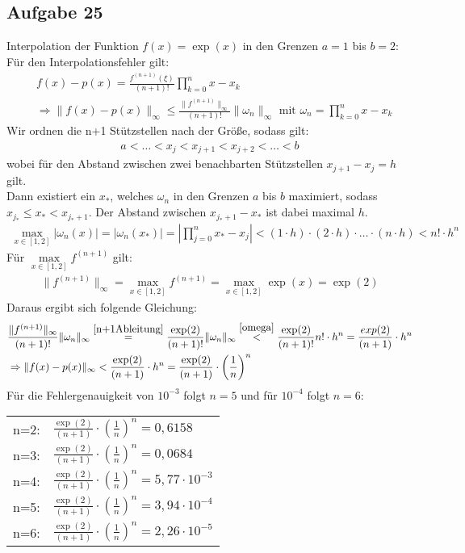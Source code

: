 \subsection*{Aufgabe 25}

Interpolation der Funktion $f(x)=\exp(x)$  in den Grenzen $a=1$ bis $b=2$:\\
\newline
Für den Interpolationsfehler gilt:
\begin{align*}
&f(x)-p(x)=\frac{f^{(n+1)}(\xi)}{(n+1)!}\prod_{k=0}^{n}x-x_k\\
&\Rightarrow \|f(x)-p(x)\|_\infty \le \frac{\|f^{(n+1)}\|_\infty}{(n+1)!} \|\omega_n\|_\infty \text{ mit } \omega_n=\prod_{k=0}^{n}x-x_k
\end{align*}
Wir ordnen die n+1 Stützstellen nach der Größe, sodass gilt:
\begin{align*}
a<\ldots<x_j<x_{j+1}<x_{j+2}<\ldots<b
\end{align*}
wobei für den Abstand zwischen zwei benachbarten Stützstellen $x_{j+1}-x_j=h$ gilt.\\
Dann existiert ein $x_*$, welches $\omega_n$ in den Grenzen $a$ bis $b$ maximiert,  sodass $x_{j_*}\le x_* < x_{j_*+1}$. Der Abstand zwischen  $x_{j_*+1}-x_*$ ist dabei maximal $h$.
\begin{align}\label{omega}
\max_{x \in [1,2]} |\omega_n(x)|=|\omega_n(x_*)|=\left|\prod_{j=0}^{n}x_*-x_j\right| < (1 \cdot h) \cdot (2 \cdot h) \cdot \ldots \cdot (n \cdot h)<n!\cdot h^n
\end{align}
Für $\underset{x \in [1,2]}{\max} f^{(n+1)}$ gilt:
\begin{align}\label{n+1Ableitung}
\|f^{(n+1)}\|_\infty=\max_{x \in [1,2]} f^{(n+1)} = \max_{x \in [1,2]} \exp(x)= \exp(2)
\end{align}
Daraus ergibt sich folgende Gleichung:
\begin{align*}
&\frac{\|f^{(n+1)}\|_\infty}{(n+1)!} \|\omega_n\|_\infty \overset{\eqref{n+1Ableitung}}{=} \frac{\exp(2)}{(n+1)!} \|\omega_n\|_\infty \overset{\eqref{omega}}{<} \frac{\exp(2)}{(n+1)!}n!\cdot h^n=\frac{exp(2)}{(n+1)}\cdot h^n\\
&\Rightarrow \|f(x)-p(x)\|_\infty < \frac{\exp(2)}{(n+1)}\cdot h^n=\frac{\exp(2)}{(n+1)}\cdot \left(\frac{1}{n}\right)^n
\end{align*}
Für die Fehlergenauigkeit von $10^{-3}$ folgt $ n= 5$ und für $10^{-4}$ folgt $n=6$:\\
\begin{tabular}{|c|l|}\hline
n=2: &$\frac{\exp(2)}{(n+1)}\cdot \left(\frac{1}{n}\right)^n=0,6158$\\
n=3: &$\frac{\exp(2)}{(n+1)}\cdot \left(\frac{1}{n}\right)^n=0,0684$\\
n=4: &$\frac{\exp(2)}{(n+1)}\cdot \left(\frac{1}{n}\right)^n=5,77\cdot 10^{-3}$\\
n=5: &$\frac{\exp(2)}{(n+1)}\cdot \left(\frac{1}{n}\right)^n=3,94 \cdot 10^{-4}$\\
n=6: &$\frac{\exp(2)}{(n+1)}\cdot \left(\frac{1}{n}\right)^n=2,26 \cdot 10^{-5}$\\\hline
\end{tabular}\\

